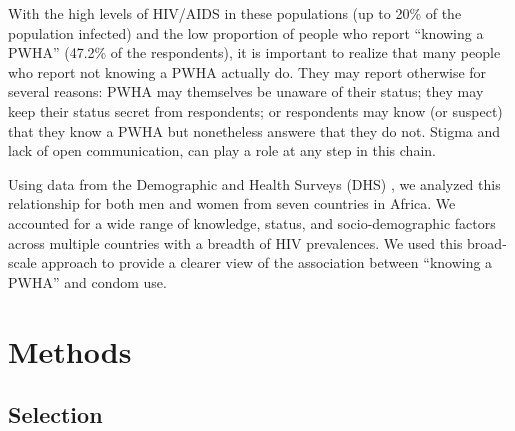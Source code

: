 \documentclass[10pt,letterpaper]{article}
\begin{document}
With the high levels of HIV/AIDS in these populations (up to 20\% of the population infected) and the low proportion of people who report ``knowing a PWHA'' (47.2\% of the respondents), it is important to realize that many people who report not knowing a PWHA actually do. They may report otherwise for several reasons: PWHA may themselves be unaware of their status; they may keep their status secret from respondents; or respondents may know (or suspect) that they know a PWHA but nonetheless answere that they do not. Stigma and lack of open communication, can play a role at any step in this chain.

Using data from the Demographic and Health Surveys (DHS) \cite{DHS}, we analyzed this relationship for both men and women from seven countries in Africa. We accounted for a wide range of knowledge, status, and socio-demographic factors across multiple countries with a breadth of HIV prevalences. 
We used this broad-scale approach to provide a clearer view of the association between ``knowing a PWHA'' and condom use.


\section{Methods}

\subsection{Selection} 
\end{document}
